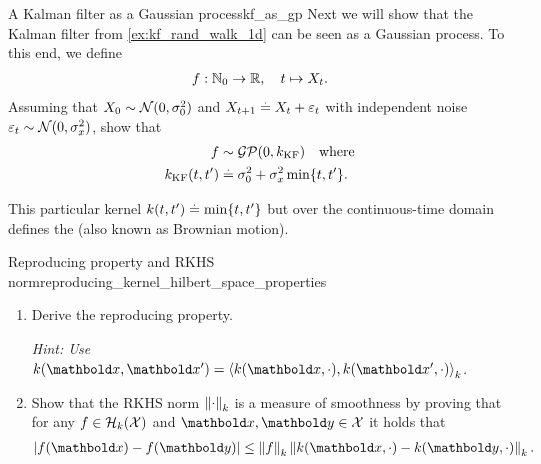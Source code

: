 \begin{nexercise}{A Kalman filter as a Gaussian process}{kf_as_gp}
  Next we will show that the Kalman filter from \cref{ex:kf_rand_walk_1d} can be seen as a Gaussian process.
  To this end, we define \begin{align}
    f : \mathbb{N}_0 \to \mathbb{R}, \quad t \mapsto X_t.
  \end{align}
  Assuming that $X_0 \sim \N{0}{\sigma_0^2}$ and $X_{t+1} \overset{.}{=} X_t + \varepsilon_t$ with independent noise $\varepsilon_t \sim \N{0}{\sigma_x^2}$, show that \begin{align}
    f &\sim \GP{0}{k_{\mathrm{KF}}} \quad\text{where} \\
    k_{\mathrm{KF}}(t, t') &\defeq \sigma_0^2 + \sigma_x^2 \min\{t, t'\}.
  \end{align}

  This particular kernel $k(t, t') \overset{.}{=} \min\{t, t'\}$ but over the continuous-time domain defines the  (also known as Brownian motion).
\end{nexercise}

\begin{nexercise}{Reproducing property and RKHS norm}{reproducing_kernel_hilbert_space_properties}
  \begin{enumerate}
    \item Derive the reproducing property.
    \par\textit{Hint: Use $k(\vx,\vxp) = \ip{k(\vx,\cdot), k(\vxp,\cdot)}_k$.}

    \item Show that the RKHS norm $\norm{\cdot}_k$ is a measure of smoothness by proving that for any $f \in \mathcal{H}_k(\mathcal{X})$ and $\vx,\vy \in \spX$ it holds that \begin{align*}
      |f(\vx) - f(\vy)| \leq \norm{f}_k \norm{k(\vx,\cdot) - k(\vy,\cdot)}_k.
    \end{align*}
  \end{enumerate}
\end{nexercise}


